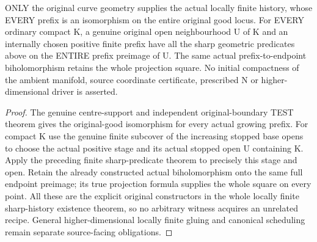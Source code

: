 \begin{theorem}
\label{hir:sharp-actual-curve-compact-prefix-sharp-geometry-and-good}
\leanok
ONLY the original curve geometry supplies the actual locally finite
history, whose EVERY prefix is an isomorphism on the entire original good
locus. For EVERY ordinary compact K, a genuine original open neighbourhood
U of K and an internally chosen positive finite prefix have all the sharp
geometric predicates above on the ENTIRE prefix preimage of U. The same
actual prefix-to-endpoint biholomorphism retains the whole projection
square. No initial compactness of the ambient manifold, source coordinate
certificate, prescribed N or higher-dimensional driver is asserted.
\end{theorem}
\begin{proof}
The genuine centre-support and independent original-boundary TEST theorem
gives the original-good isomorphism for every actual growing prefix.
For compact K use the genuine finite subcover of the increasing stopped
base opens to choose the actual positive stage and its actual stopped
open U containing K. Apply the preceding finite sharp-predicate theorem
to precisely this stage and open. Retain the already constructed actual
biholomorphism onto the same full endpoint preimage; its true projection
formula supplies the whole square on every point. All these are the
explicit original constructors in the whole locally finite sharp-history
existence theorem, so no arbitrary witness acquires an unrelated recipe.
General higher-dimensional locally finite gluing and canonical scheduling
remain separate source-facing obligations.
\end{proof}
